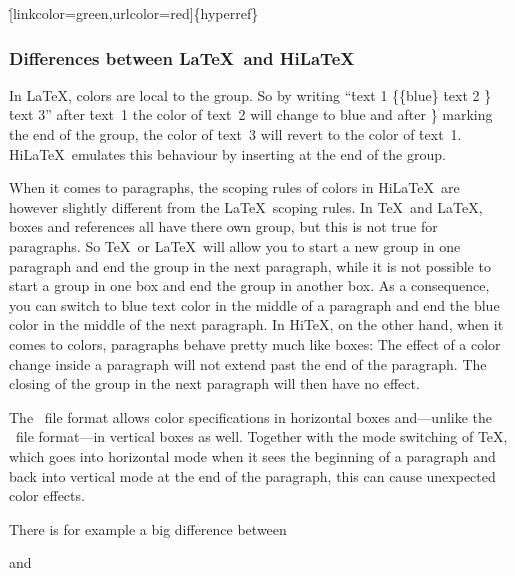\.{[linkcolor=green,urlcolor=red]\{hyperref\}}

\subsubsection{Differences between \LaTeX\ and Hi\LaTeX}

\par\smallskip\noindent
In \LaTeX, colors are local to the group. So by writing
``\.{text 1} \.{\{}\.{\{blue\}} \.{text 2} \.{\}} \.{text 3}''
after \.{text~1} the color of \.{text~2} will change to  blue and after \.{\}}
marking the end of the group, the color of \.{text~3} will revert to the
color of \.{text~1}. Hi\LaTeX\ emulates this behaviour by inserting
 at the end of the group.

When it comes to paragraphs,
the scoping rules of colors in Hi\LaTeX\ are however slightly
different from the \LaTeX\ scoping rules.
In \TeX\ and \LaTeX, boxes and references all have there own group,
but this is not true for paragraphs.
So \TeX\ or \LaTeX\ will allow you to start a new group in one paragraph and
end the group in the next paragraph, while it is not possible to start a
group in one box and end the group in another box. As a consequence,
you can switch to blue text color in the middle of a paragraph and end the blue
color in the middle of the next paragraph.
In Hi\TeX, on the other hand, when it comes to colors,
paragraphs behave pretty much like boxes: The effect of a color change inside
a paragraph will not extend past the end of the paragraph. The closing of the
group in the next paragraph will then have no effect.

\bigskip{}\par\smallskip\noindent
The \HINT\ file format allows color specifications in horizontal boxes
and---unlike the \PDF\ file format---in vertical boxes as well.
Together with the mode switching of \TeX, which goes into horizontal mode
when it sees the beginning of a paragraph and back into vertical mode at
the end of the paragraph, this can cause unexpected color effects.

There is for example a big difference between

\medskip
and
\medskip

